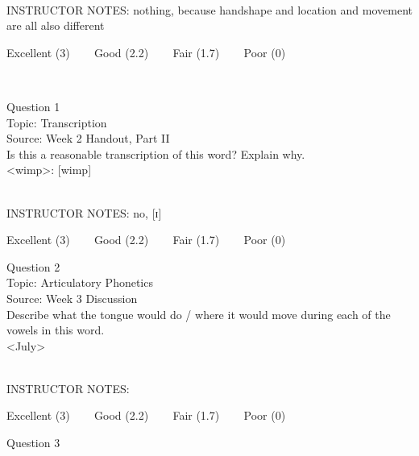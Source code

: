 \documentclass[12pt]{article}
\begin{document}
~\\
INSTRUCTOR NOTES: nothing, because handshape and location and movement are all also different


\vfill
Excellent (3) ~~~ Good (2.2) ~~~ Fair (1.7) ~~~ Poor (0)
\newpage

\begin{center}
\textbf{{\color{red}{\HUGE END OF EXAM}}}\\

\end{center}
\newpage

\begin{center}
\textbf{{\color{blue}{\HUGE START OF EXAM\\}}}

\textbf{{\color{blue}{\HUGE Student ID: 81020\\}}}

\textbf{{\color{blue}{\HUGE \\}}}

\end{center}
\newpage

{\large Question 1}\\

Topic: Transcription\\
Source: Week 2 Handout, Part II\\

Is this a reasonable transcription of this word? Explain why.\\

<wimp>: {[wimp]}


~\\
INSTRUCTOR NOTES: no, [ɪ]


\vfill
Excellent (3) ~~~ Good (2.2) ~~~ Fair (1.7) ~~~ Poor (0)
\newpage

{\large Question 2}\\

Topic: Articulatory Phonetics\\
Source: Week 3 Discussion\\

Describe what the tongue would do / where it would move during each of the vowels in this word.\\

<July>


~\\
INSTRUCTOR NOTES: 


\vfill
Excellent (3) ~~~ Good (2.2) ~~~ Fair (1.7) ~~~ Poor (0)
\newpage

{\large Question 3}\\
\end{document}
